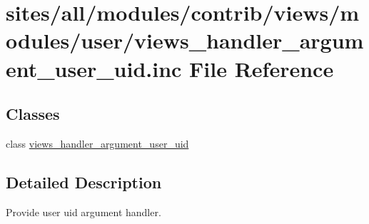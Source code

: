 \hypertarget{views__handler__argument__user__uid_8inc}{
\section{sites/all/modules/contrib/views/modules/user/views\_\-handler\_\-argument\_\-user\_\-uid.inc File Reference}
\label{views__handler__argument__user__uid_8inc}
}
\subsection*{Classes}
\begin{CompactItemize}
\item 
class \hyperlink{classviews__handler__argument__user__uid}{views\_\-handler\_\-argument\_\-user\_\-uid}
\end{CompactItemize}


\subsection{Detailed Description}
Provide user uid argument handler. 